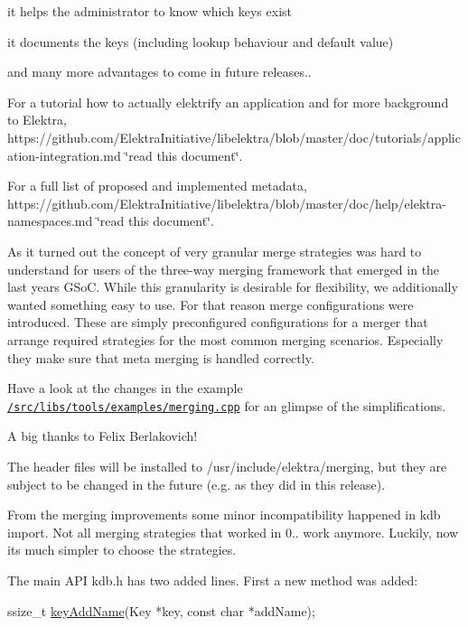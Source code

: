 \begin{DoxyItemize}
\item it helps the administrator to know which keys exist
\item it documents the keys (including lookup behaviour and default value)
\item and many more advantages to come in future releases..
\end{DoxyItemize}

For a tutorial how to actually elektrify an application and for more background to Elektra, https\+://github.com/\+Elektra\+Initiative/libelektra/blob/master/doc/tutorials/application-\/integration.\+md \char`\"{}read this document\char`\"{}.

For a full list of proposed and implemented metadata, https\+://github.com/\+Elektra\+Initiative/libelektra/blob/master/doc/help/elektra-\/namespaces.\+md \char`\"{}read this document\char`\"{}.

As it turned out the concept of very granular merge strategies was hard to understand for users of the three-\/way merging framework that emerged in the last year\textquotesingle{}s G\+SoC. While this granularity is desirable for flexibility, we additionally wanted something easy to use. For that reason merge configurations were introduced. These are simply preconfigured configurations for a merger that arrange required strategies for the most common merging scenarios. Especially they make sure that meta merging is handled correctly.

Have a look at the changes in the example \href{https://github.com/ElektraInitiative/libelektra/blob/master/src/libs/tools/examples/merging.cpp}{\tt /src/libs/tools/examples/merging.cpp} for an glimpse of the simplifications.

A big thanks to Felix Berlakovich!

The header files will be installed to /usr/include/elektra/merging, but they are subject to be changed in the future (e.\+g. as they did in this release).

From the merging improvements some minor incompatibility happened in {\ttfamily kdb import}. Not all merging strategies that worked in 0.. work anymore. Luckily, now its much simpler to choose the strategies.

The main A\+PI kdb.\+h has two added lines. First a new method was added\+:


\begin{DoxyCode}
ssize\_t \hyperlink{group__keyname_gaa70593a2c772c4b7bc33423b9b10a270}{keyAddName}(Key *key, \textcolor{keyword}{const} \textcolor{keywordtype}{char} *addName);
\end{DoxyCode}


